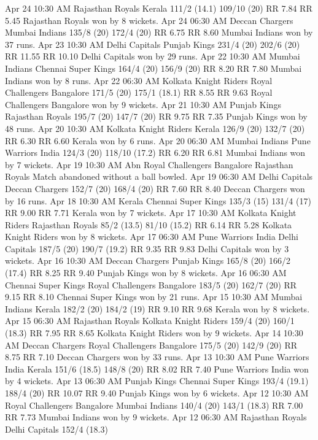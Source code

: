 Apr 24
10:30 AM
Rajasthan Royals
Kerala
111/2 (14.1)
109/10 (20)
RR 7.84
RR 5.45
Rajasthan Royals won by 8 wickets.
Apr 24
06:30 AM
Deccan Chargers
Mumbai Indians
135/8 (20)
172/4 (20)
RR 6.75
RR 8.60
Mumbai Indians won by 37 runs.
Apr 23
10:30 AM
Delhi Capitals
Punjab Kings
231/4 (20)
202/6 (20)
RR 11.55
RR 10.10
Delhi Capitals won by 29 runs.
Apr 22
10:30 AM
Mumbai Indians
Chennai Super Kings
164/4 (20)
156/9 (20)
RR 8.20
RR 7.80
Mumbai Indians won by 8 runs.
Apr 22
06:30 AM
Kolkata Knight Riders
Royal Challengers Bangalore
171/5 (20)
175/1 (18.1)
RR 8.55
RR 9.63
Royal Challengers Bangalore won by 9 wickets.
Apr 21
10:30 AM
Punjab Kings
Rajasthan Royals
195/7 (20)
147/7 (20)
RR 9.75
RR 7.35
Punjab Kings won by 48 runs.
Apr 20
10:30 AM
Kolkata Knight Riders
Kerala
126/9 (20)
132/7 (20)
RR 6.30
RR 6.60
Kerala won by 6 runs.
Apr 20
06:30 AM
Mumbai Indians
Pune Warriors India
124/3 (20)
118/10 (17.2)
RR 6.20
RR 6.81
Mumbai Indians won by 7 wickets.
Apr 19
10:30 AM
Abn
Royal Challengers Bangalore
Rajasthan Royals
Match abandoned without a ball bowled.
Apr 19
06:30 AM
Delhi Capitals
Deccan Chargers
152/7 (20)
168/4 (20)
RR 7.60
RR 8.40
Deccan Chargers won by 16 runs.
Apr 18
10:30 AM
Kerala
Chennai Super Kings
135/3 (15)
131/4 (17)
RR 9.00
RR 7.71
Kerala won by 7 wickets.
Apr 17
10:30 AM
Kolkata Knight Riders
Rajasthan Royals
85/2 (13.5)
81/10 (15.2)
RR 6.14
RR 5.28
Kolkata Knight Riders won by 8 wickets.
Apr 17
06:30 AM
Pune Warriors India
Delhi Capitals
187/5 (20)
190/7 (19.2)
RR 9.35
RR 9.83
Delhi Capitals won by 3 wickets.
Apr 16
10:30 AM
Deccan Chargers
Punjab Kings
165/8 (20)
166/2 (17.4)
RR 8.25
RR 9.40
Punjab Kings won by 8 wickets.
Apr 16
06:30 AM
Chennai Super Kings
Royal Challengers Bangalore
183/5 (20)
162/7 (20)
RR 9.15
RR 8.10
Chennai Super Kings won by 21 runs.
Apr 15
10:30 AM
Mumbai Indians
Kerala
182/2 (20)
184/2 (19)
RR 9.10
RR 9.68
Kerala won by 8 wickets.
Apr 15
06:30 AM
Rajasthan Royals
Kolkata Knight Riders
159/4 (20)
160/1 (18.3)
RR 7.95
RR 8.65
Kolkata Knight Riders won by 9 wickets.
Apr 14
10:30 AM
Deccan Chargers
Royal Challengers Bangalore
175/5 (20)
142/9 (20)
RR 8.75
RR 7.10
Deccan Chargers won by 33 runs.
Apr 13
10:30 AM
Pune Warriors India
Kerala
151/6 (18.5)
148/8 (20)
RR 8.02
RR 7.40
Pune Warriors India won by 4 wickets.
Apr 13
06:30 AM
Punjab Kings
Chennai Super Kings
193/4 (19.1)
188/4 (20)
RR 10.07
RR 9.40
Punjab Kings won by 6 wickets.
Apr 12
10:30 AM
Royal Challengers Bangalore
Mumbai Indians
140/4 (20)
143/1 (18.3)
RR 7.00
RR 7.73
Mumbai Indians won by 9 wickets.
Apr 12
06:30 AM
Rajasthan Royals
Delhi Capitals
152/4 (18.3)
